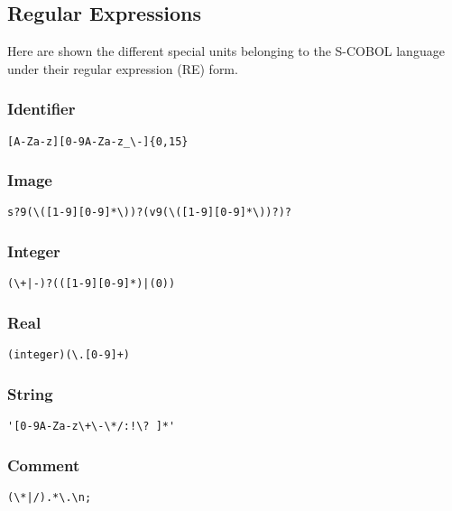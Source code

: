 \subsection{Regular Expressions}


Here are shown the different special units belonging to the S-COBOL language under their regular expression (RE) form.

\subsubsection{Identifier}

\begin{verbatim}
[A-Za-z][0-9A-Za-z_\-]{0,15}
\end{verbatim}


\subsubsection{Image}

\begin{verbatim}
s?9(\([1-9][0-9]*\))?(v9(\([1-9][0-9]*\))?)?
\end{verbatim}


\subsubsection{Integer}

\begin{verbatim}
(\+|-)?(([1-9][0-9]*)|(0))
\end{verbatim}


\subsubsection{Real}

\begin{verbatim}
(integer)(\.[0-9]+)
\end{verbatim}


\subsubsection{String}

\begin{verbatim}
'[0-9A-Za-z\+\-\*/:!\? ]*'
\end{verbatim}


\subsubsection{Comment}

\begin{verbatim}
(\*|/).*\.\n;
\end{verbatim}